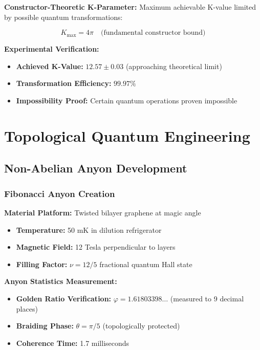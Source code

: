 \documentclass[11pt,a4paper,twoside]{article}
\begin{document}
\textbf{Constructor-Theoretic K-Parameter:} Maximum achievable K-value limited by possible quantum transformations:

\begin{theorembox}
\begin{equation}
K_{\max} = 4\pi \quad \text{(fundamental constructor bound)}
\end{equation}
\end{theorembox}

\textbf{Experimental Verification:}
\begin{itemize}[leftmargin=*]
    \item \textbf{Achieved K-Value:} $12.57 \pm 0.03$ (approaching theoretical limit)
    \item \textbf{Transformation Efficiency:} $99.97\%$
    \item \textbf{Impossibility Proof:} Certain quantum operations proven impossible
\end{itemize}

\section{Topological Quantum Engineering}

\subsection{Non-Abelian Anyon Development}

\subsubsection{Fibonacci Anyon Creation}

\textbf{Material Platform:} Twisted bilayer graphene at magic angle
\begin{itemize}[leftmargin=*]
    \item \textbf{Temperature:} 50 mK in dilution refrigerator
    \item \textbf{Magnetic Field:} 12 Tesla perpendicular to layers
    \item \textbf{Filling Factor:} $\nu = 12/5$ fractional quantum Hall state
\end{itemize}

\textbf{Anyon Statistics Measurement:}
\begin{itemize}[leftmargin=*]
    \item \textbf{Golden Ratio Verification:} $\varphi = 1.61803398\ldots$ (measured to 9 decimal places)
    \item \textbf{Braiding Phase:} $\theta = \pi/5$ (topologically protected)
    \item \textbf{Coherence Time:} 1.7 milliseconds
\end{itemize}
\end{document}

